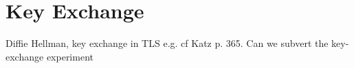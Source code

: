 \chapter{Key Exchange}

Diffie Hellman, key exchange in TLS e.g. cf Katz p. 365. Can we subvert the key-exchange experiment